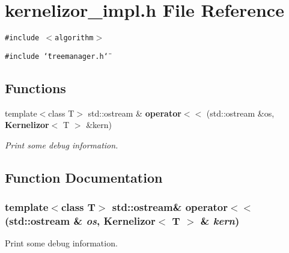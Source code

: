 \section{kernelizor\_\-impl.h File Reference}
\label{kernelizor__impl_8h}
{\tt \#include $<$algorithm$>$}\par
{\tt \#include \char`\"{}treemanager.h\char`\"{}}\par
\subsection*{Functions}
\begin{CompactItemize}
\item 
template$<$class T$>$ std::ostream \& {\bf operator$<$$<$} (std::ostream \&os, {\bf Kernelizor}$<$ T $>$ \&kern)
\begin{CompactList}\small\item\em Print some debug information. \item\end{CompactList}\end{CompactItemize}


\subsection{Function Documentation}
\subsubsection{\setlength{\rightskip}{0pt plus 5cm}template$<$class T$>$ std::ostream\& operator$<$$<$ (std::ostream \& {\em os}, {\bf Kernelizor}$<$ T $>$ \& {\em kern})}\label{kernelizor__impl_8h_a0}


Print some debug information. 

